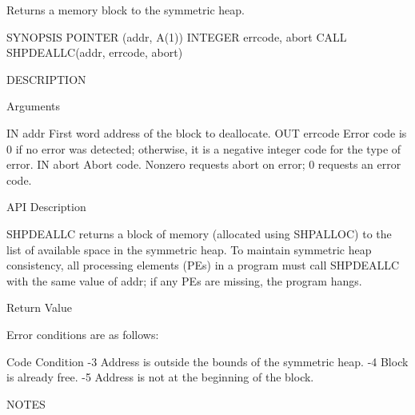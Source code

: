       Returns a memory block to the symmetric heap.

SYNOPSIS
       POINTER (addr, A(1))
       INTEGER errcode, abort
       CALL SHPDEALLC(addr, errcode, abort)

DESCRIPTION

Arguments

       IN	addr	      First word address of the block to deallocate.
       OUT	errcode	      Error  code is 0 if no error was detected; otherwise, it
		      is a  negative  integer  code  for  the  type  of	 error.
       IN	abort	      Abort code.  Nonzero requests abort on error; 0 requests
		      an error code.

API Description

       SHPDEALLC  returns  a block of memory (allocated using SHPALLOC) to the
       list of available space in the symmetric heap.  To  maintain  symmetric
       heap  consistency, all processing elements (PEs) in a program must call
       SHPDEALLC with the same value of addr; if  any  PEs  are	 missing,  the
       program hangs.


Return Value

       Error conditions are as follows:

       Code	      Condition
       -3	      Address is outside the bounds of the symmetric heap.
       -4	      Block is already free.
       -5	      Address is not at the beginning of the block.

NOTES
